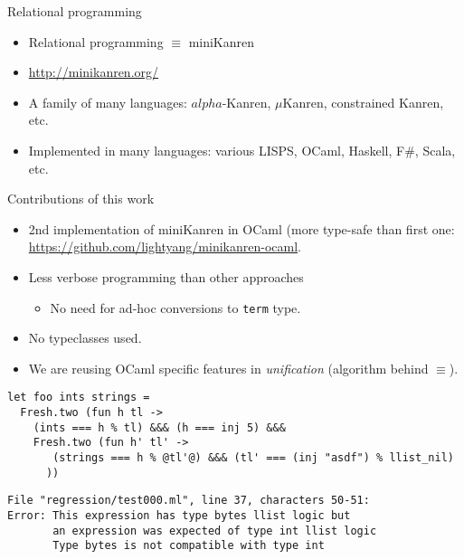 \documentclass [mathserif]{beamer}
\theoremstyle{definition}
\begin{document}
\begin{frame}{Relational programming}

\begin{itemize}
 \item Relational programming $\equiv$ miniKanren
 \item \url{ http://minikanren.org/}
 \item A family of many languages: $alpha$-Kanren, $\mu$Kanren, constrained Kanren, etc.
 \item Implemented in many languages: various LISPS, OCaml, Haskell, F\#, Scala, etc.
\end{itemize}
 
\end{frame}

\begin{frame}{Contributions of this work}
\begin{itemize}
 \item 2nd implementation of miniKanren in OCaml (more type-safe than first one: 
   \url{https://github.com/lightyang/minikanren-ocaml}.
 \item Less verbose programming than other approaches
   \begin{itemize}
    \item No need for ad-hoc conversions to \texttt{term} type.
   \end{itemize}
  \item No typeclasses used.
  \item We are reusing OCaml specific features in \textit{unification} (algorithm behind $\equiv$).
\end{itemize}
\end{frame}

\begin{frame}[fragile]
\begin{lstlisting}
let foo ints strings =
  Fresh.two (fun h tl ->
    (ints === h % tl) &&& (h === inj 5) &&&
    Fresh.two (fun h' tl' ->
       (strings === h % @tl'@) &&& (tl' === (inj "asdf") % llist_nil)
      ))
\end{lstlisting}

\begin{verbatim}
File "regression/test000.ml", line 37, characters 50-51:
Error: This expression has type bytes llist logic but 
       an expression was expected of type int llist logic
       Type bytes is not compatible with type int \end{verbatim}

\end{frame}
\end{document}
